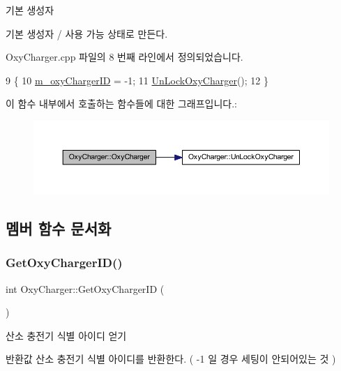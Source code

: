 기본 생성자 

기본 생성자 / 사용 가능 상태로 만든다. 

Oxy\+Charger.\+cpp 파일의 8 번째 라인에서 정의되었습니다.


\begin{DoxyCode}
9 \{
10     \hyperlink{class_oxy_charger_a7229fb2e4423cad1f648bd710ee8d092}{m\_oxyChargerID} = -1;
11     \hyperlink{class_oxy_charger_abe01eac96e95d7a667d782829abd51dd}{UnLockOxyCharger}();
12 \}
\end{DoxyCode}
이 함수 내부에서 호출하는 함수들에 대한 그래프입니다.\+:\nopagebreak
\begin{figure}[H]
\begin{center}
\leavevmode
\includegraphics[width=350pt]{class_oxy_charger_a3aa077d7dc2310cdc7006a178f92f1f7_cgraph}
\end{center}
\end{figure}


\subsection{멤버 함수 문서화}
\mbox{\label{class_oxy_charger_a478c6f15601d6fecab42c7d0c839a870}} 
\subsubsection{\texorpdfstring{Get\+Oxy\+Charger\+I\+D()}{GetOxyChargerID()}}
{\footnotesize\ttfamily int Oxy\+Charger\+::\+Get\+Oxy\+Charger\+ID (\begin{DoxyParamCaption}{ }\end{DoxyParamCaption})}



산소 충전기 식별 아이디 얻기 

\begin{DoxyReturn}{반환값}
산소 충전기 식별 아이디를 반환한다. ( -\/1 일 경우 세팅이 안되어있는 것 ) 
\end{DoxyReturn}


